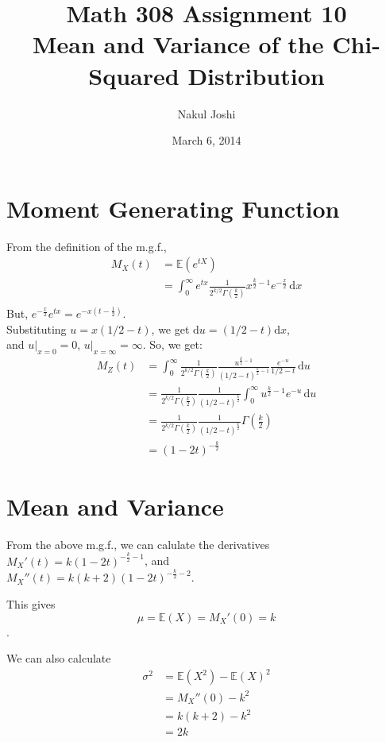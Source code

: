 \documentclass[twocolumn]{article}
\title{Math 308 Assignment 10\\Mean and Variance of the Chi-Squared Distribution}
\author{Nakul Joshi}
\date{March 6, 2014}
\newcommand{\ev}[1]{\mathbb{E}(#1)}
\newcommand{\rmd}{\mathrm{d}}
\newcommand{\intg}[4]{\int_{#1}^{#2} \! #3 \, \rmd#4}
\newcommand{\hk}{\frac{k}{2}}
\newcommand{\ga}{\Gamma\left(\hk\right)}
\begin{document}
\maketitle

\section{Moment Generating Function}
From the definition of the m.g.f., \begin{align*}
M_X(t)&=\ev{e^{tX}}\\
&=\intg{0}{\infty}{
	e^{tx} \frac{1}{2^{k/2}\ga} x^{\hk-1} e^{-\frac{x}{2}}
}{x}\\
\end{align*}
But, $e^{-\frac{x}{2}}e^{tx}= e^{-x(t-\frac{1}{2})}$.\\
Substituting $u=x(1/2-t)$, we get $\rmd u= (1/2-t)\rmd x$,\\
and $u|_{x=0}=0$, $u|_{x=\infty}=\infty$.
So, we get:\begin{align*}
M_Z(t)
&=\intg{0}{\infty}{
	\frac{1}{2^{k/2} \ga} \frac{u^{\hk-1}}{(1/2-t)^{\hk-1}} \frac{e^{-u}}{1/2-t}
}{u}\\
&=\frac{1}{2^{k/2} \ga} \frac{1}{(1/2-t)^{\hk}} \intg{0}{\infty}{
	u^{\hk-1} e^{-u}
}{u}\\
&= \frac{1}{2^{k/2} \ga} \frac{1}{(1/2-t)^{\hk}} \ga \\
&= (1-2t)^{-\hk}
\end{align*}

\newpage

\section{Mean and Variance}

From the above m.g.f., we can calulate the derivatives\\
$M_X'(t)=k(1-2t)^{-\hk-1}$, and\\ $M_X''(t)=k(k+2)(1-2t)^{-\hk-2}$.

This gives \[\mu= \ev{X}= M_X'(0)=k\].

We can also calculate\begin{align*}
\sigma^2&=\ev{X^2}-{\ev{X}}^2\\
&=M_X''(0)-k^2\\
&=k(k+2)-k^2\\
&=2k
\end{align*}
\end{document}

